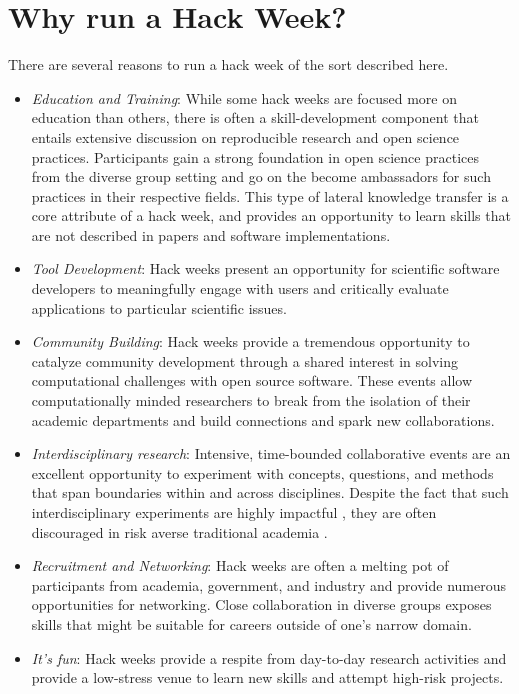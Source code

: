 \section*{Why run a Hack Week?}

There are several reasons to run a hack week of the sort described here.

\begin{itemize}
\item{\textit{Education and Training}: 
While some hack weeks are focused more on education than others, there is often a skill-development component that entails extensive discussion on reproducible research and open science practices. Participants gain a strong foundation in open science practices from the diverse group setting and go on the become ambassadors for such practices in their respective fields. This type of lateral knowledge transfer is a core attribute of a hack week, and provides an opportunity to learn skills that are not described in papers and software implementations.}

\item{\textit{Tool Development}: Hack weeks present an opportunity for scientific software developers to meaningfully engage with users and critically evaluate applications to particular scientific issues.}

\item{\textit{Community Building}: Hack weeks provide a tremendous opportunity to catalyze community development through a shared interest in solving computational challenges with open source software. These events allow computationally minded researchers to break from the isolation of their academic departments and build connections and spark new collaborations.}


\item{\textit{Interdisciplinary research}: Intensive, time-bounded collaborative events are an excellent opportunity to experiment with concepts, questions, and methods that span boundaries within and across disciplines. Despite the fact that such interdisciplinary experiments are highly impactful \cite{Hall2012-hi}, they are often discouraged in risk averse traditional academia \cite{Sung2003-go, Rhoten2004-fk}}.

\item{\textit{Recruitment and Networking}: Hack weeks are often a melting pot of participants from academia, government, and industry and provide numerous opportunities for networking. Close collaboration in diverse groups exposes skills that might be suitable for careers outside of one's narrow domain.}

\item{\textit{It's fun}: Hack weeks provide a respite from day-to-day research activities and provide a low-stress venue to learn new skills and attempt high-risk projects.}

\end{itemize}


